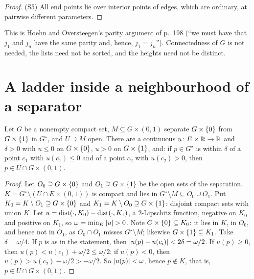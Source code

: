 \begin{proof}
(S5) All end points lie over interior points of edges, which are ordinary, at pairwise different parameters.
\end{proof}


This is Hoehn and Oversteegen's parity argument of p.~198 (``we must have that $j_1$ and $j_n$ have the same parity and, hence, $j_1=j_n$''). Connectedness of $G$ is not
needed, the lists need not be sorted, and the heights need not be distinct.

\section{A ladder inside a neighbourhood of a separator}

\begin{lemma}\label{lem:sign-fn}
Let $G$ be a nonempty compact set, $M\subseteq G\times(0,1)$ separate $G\times\left\{ 0 \right\}$ from $G\times\left\{ 1 \right\}$ in $G^\star$, and $U\supseteq M$ open. There are a continuous $u\colon E\times\mathbb{R}\to\mathbb{R}$ and $\delta>0$
with $u\le0$ on $G\times\left\{ 0 \right\}$, $u>0$ on $G\times\left\{ 1 \right\}$, and: if $p\in G^\star$ is within $\delta$ of a point $c_1$ with $u(c_1)\le0$ and of a point $c_2$ with $u(c_2)>0$, then $p\in U\cap G\times(0,1)$.
\end{lemma}

\begin{proof}
Let $O_0\supseteq G\times\left\{ 0 \right\}$ and $O_1\supseteq G\times\left\{ 1 \right\}$ be the open sets of the separation. $K=G^\star\setminus(U\cap E\times(0,1))$ is compact and lies in $G^\star\setminus M\subseteq O_0\cup O_1$. Put
$K_0=K\setminus O_1\supseteq G\times\left\{ 0 \right\}$ and $K_1=K\setminus O_0\supseteq G\times\left\{ 1 \right\}$: disjoint compact sets with union $K$. Let $u=\operatorname{dist}(\cdot,K_0)-\operatorname{dist}(\cdot,K_1)$, a $2$-Lipschitz function, negative on
$K_0$ and positive on $K_1$, so $\omega=\min_K\left\lvert u\right\rvert>0$. Note $G\times\left\{ 0 \right\}\subseteq K_0$: it lies in $K$, in $O_0$, and hence not in $O_1$, as $O_0\cap O_1$ misses $G^\star\setminus M$; likewise
$G\times\left\{ 1 \right\}\subseteq K_1$. Take $\delta=\omega/4$. If $p$ is as in the statement, then $\left\lvert u(p)-u(c_i)\right\rvert<2\delta=\omega/2$. If $u(p)\ge0$, then $u(p)<u(c_1)+\omega/2\le\omega/2$; if $u(p)<0$,
then $u(p)>u(c_2)-\omega/2>-\omega/2$. So $\left\lvert u(p)\right\rvert<\omega$, hence $p\notin K$, that is, $p\in U\cap G\times(0,1)$.
\end{proof}

